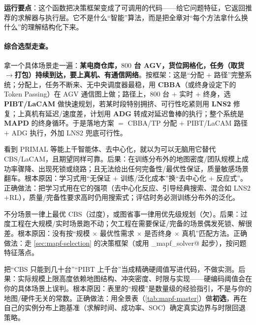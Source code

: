 \textbf{运行要点}：这个函数把决策框架变成了可调用的代码——给它问题特征，它返回推荐的求解器与执行层。它不是什么“智能”算法，而是把全章对“每个方法拿什么换什么”的理解结构化下来。

\paragraph{综合选型走查。}
拿一个具体场景走一遍：\textbf{某电商仓库，$800$ 台 AGV，货位网格化，任务（取货$\to$打包）持续到达，要上真机、有通信网络}。按框架：这是“分配 $+$ 路径”完整系统；分配上，任务不断来、无中央调度器最稳，用 \textbf{CBBA}（或终身设定下的 Token Passing）在 AGV 通信图上做；路径上，$800$ 台 $+$ 实时 $+$ 终身，选 \textbf{PIBT/LaCAM} 做快速规划，若某时段特别拥挤、可行性吃紧则用 \textbf{LNS2} 修复；上真机有延迟/速度差，计划用 \textbf{ADG} 转成对延迟鲁棒的执行；整个系统是 \textbf{MAPD} 的终身循环。于是落地方案 $=$ CBBA/TP 分配 $+$ PIBT/LaCAM 路径 $+$ ADG 执行，外加 LNS2 兜底可行性。

\begin{pitfall}
看到 PRIMAL 等能上千智能体、去中心化，就以为可以无脑用它替代 CBS/LaCAM，且期望同样可靠。后果：在训练分布外的地图密度/团队规模上成功率骤降、出现死锁或绕路；且无法给出任何完备性/最优性保证，质量敏感场景翻车。根本原因：学习式用“无保证 $+$ 训练/泛化成本”换“去中心化 $+$ 反应式”。正确做法：把学习式用在它的强项（去中心化反应、引导经典搜索、混合如 LNS2$+$RL），质量/完备性要求高时仍用搜索式；评估时务必测训练分布外的泛化。
\end{pitfall}

\begin{pitfall}
不分场景一律上最优 CBS（过度），或图省事一律用优先级规划（欠）。后果：过度工程在大规模/实时场景跑不动；欠工程在需要保证/完备的场景偶发死锁、解很差。根本原因：没有按“规模 $\times$ 最优性需求 $\times$ 是否终身 $\times$ 真机”匹配方法。正确做法：走 \cref{sec:mapf-selection} 的决策框架（或用 \verb@recommend_mapf_solver@ 起步），按问题特征落点。
\end{pitfall}

\begin{pitfall}
把“CBS 只能到几十台”“PIBT 上千台”当成精确硬阈值写进代码，不做实测。后果：实际规模上限高度依赖地图结构、冲突密度、时限与实现——硬编码阈值会在你的具体场景上误判。根本原因：表里的“规模”是数量级的经验指引，不是与你的地图/硬件无关的常数。正确做法：用全景表（\cref{tab:mapf-master}）做\textbf{初选}，再在自己的实例分布上跑基准（求解时间、成功率、SOC）确定真实边界与时限回退策略。
\end{pitfall}

